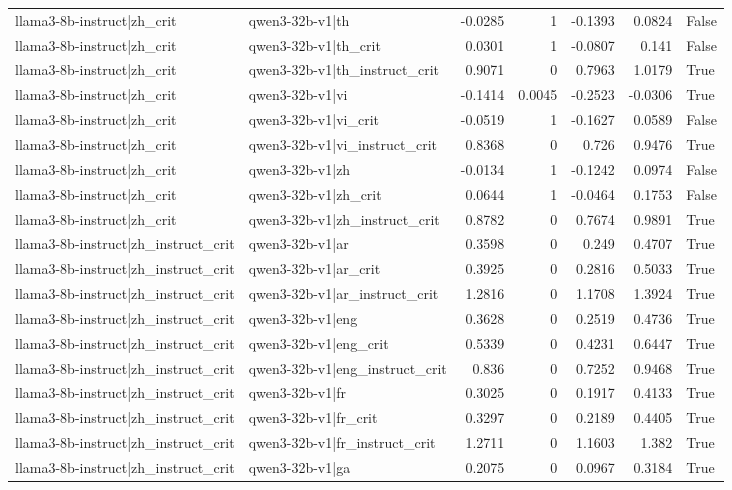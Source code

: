 \begin{table}
\begin{tabular}{l l r r r r l}
llama3-8b-instruct|zh_crit & qwen3-32b-v1|th & -0.0285 & 1 & -0.1393 & 0.0824 & False \\
llama3-8b-instruct|zh_crit & qwen3-32b-v1|th_crit & 0.0301 & 1 & -0.0807 & 0.141 & False \\
llama3-8b-instruct|zh_crit & qwen3-32b-v1|th_instruct_crit & 0.9071 & 0 & 0.7963 & 1.0179 & True \\
llama3-8b-instruct|zh_crit & qwen3-32b-v1|vi & -0.1414 & 0.0045 & -0.2523 & -0.0306 & True \\
llama3-8b-instruct|zh_crit & qwen3-32b-v1|vi_crit & -0.0519 & 1 & -0.1627 & 0.0589 & False \\
llama3-8b-instruct|zh_crit & qwen3-32b-v1|vi_instruct_crit & 0.8368 & 0 & 0.726 & 0.9476 & True \\
llama3-8b-instruct|zh_crit & qwen3-32b-v1|zh & -0.0134 & 1 & -0.1242 & 0.0974 & False \\
llama3-8b-instruct|zh_crit & qwen3-32b-v1|zh_crit & 0.0644 & 1 & -0.0464 & 0.1753 & False \\
llama3-8b-instruct|zh_crit & qwen3-32b-v1|zh_instruct_crit & 0.8782 & 0 & 0.7674 & 0.9891 & True \\
llama3-8b-instruct|zh_instruct_crit & qwen3-32b-v1|ar & 0.3598 & 0 & 0.249 & 0.4707 & True \\
llama3-8b-instruct|zh_instruct_crit & qwen3-32b-v1|ar_crit & 0.3925 & 0 & 0.2816 & 0.5033 & True \\
llama3-8b-instruct|zh_instruct_crit & qwen3-32b-v1|ar_instruct_crit & 1.2816 & 0 & 1.1708 & 1.3924 & True \\
llama3-8b-instruct|zh_instruct_crit & qwen3-32b-v1|eng & 0.3628 & 0 & 0.2519 & 0.4736 & True \\
llama3-8b-instruct|zh_instruct_crit & qwen3-32b-v1|eng_crit & 0.5339 & 0 & 0.4231 & 0.6447 & True \\
llama3-8b-instruct|zh_instruct_crit & qwen3-32b-v1|eng_instruct_crit & 0.836 & 0 & 0.7252 & 0.9468 & True \\
llama3-8b-instruct|zh_instruct_crit & qwen3-32b-v1|fr & 0.3025 & 0 & 0.1917 & 0.4133 & True \\
llama3-8b-instruct|zh_instruct_crit & qwen3-32b-v1|fr_crit & 0.3297 & 0 & 0.2189 & 0.4405 & True \\
llama3-8b-instruct|zh_instruct_crit & qwen3-32b-v1|fr_instruct_crit & 1.2711 & 0 & 1.1603 & 1.382 & True \\
llama3-8b-instruct|zh_instruct_crit & qwen3-32b-v1|ga & 0.2075 & 0 & 0.0967 & 0.3184 & True \\

\end{tabular}
\end{table}
